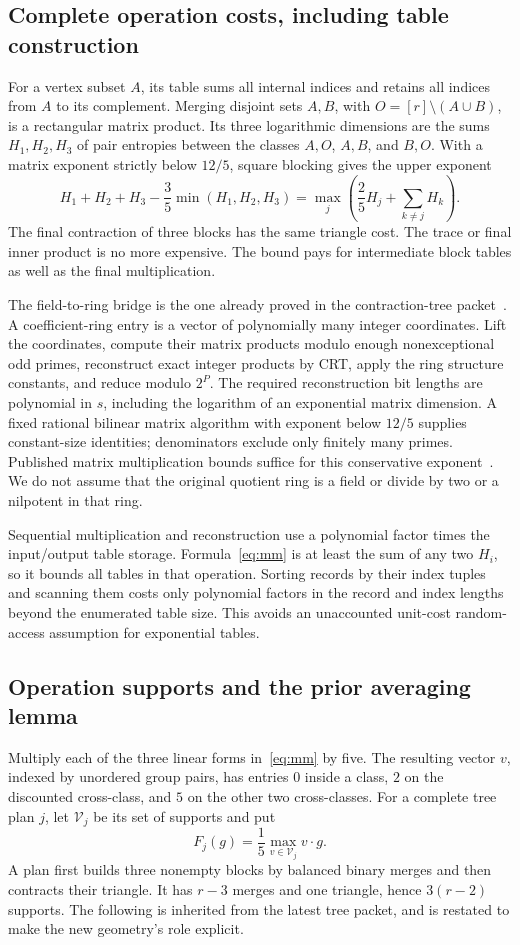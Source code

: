 \subsection{Complete operation costs, including table construction}
For a vertex subset $A$, its table sums all internal indices and retains all
indices from $A$ to its complement. Merging disjoint sets $A,B$, with
$O=[r]\setminus(A\cup B)$, is a rectangular matrix product. Its three
logarithmic dimensions are the sums $H_1,H_2,H_3$ of pair entropies between
the classes $A,O$, $A,B$, and $B,O$. With a matrix exponent strictly below
$12/5$, square blocking gives the upper exponent
\begin{equation}
 H_1+H_2+H_3-\frac35\min(H_1,H_2,H_3)
 =\max_j\left(\frac25H_j+\sum_{k\ne j}H_k\right).\label{eq:mm}
\end{equation}
The final contraction of three blocks has the same triangle cost. The trace
or final inner product is no more expensive. The bound pays for intermediate
block tables as well as the final multiplication.

The field-to-ring bridge is the one already proved in the contraction-tree
packet~\cite{tree,tree-old}. A coefficient-ring entry is a vector of
polynomially many integer coordinates. Lift the coordinates, compute their
matrix products modulo enough nonexceptional odd primes, reconstruct exact
integer products by CRT, apply the ring structure constants, and reduce
modulo $2^P$. The required reconstruction bit lengths are polynomial in
$s$, including the logarithm of an exponential matrix dimension. A fixed
rational bilinear matrix algorithm with exponent below $12/5$ supplies
constant-size identities; denominators exclude only finitely many primes.
Published matrix multiplication bounds suffice for this conservative
exponent~\cite{mm}. We do not assume that the original quotient ring is a
field or divide by two or a nilpotent in that ring.

Sequential multiplication and reconstruction use a polynomial factor times
the input/output table storage. Formula~\eqref{eq:mm} is at least the sum
of any two $H_i$, so it bounds all tables in that operation. Sorting records
by their index tuples and scanning them costs only polynomial factors in the
record and index lengths beyond the enumerated table size. This avoids an
unaccounted unit-cost random-access assumption for exponential tables.

\subsection{Operation supports and the prior averaging lemma}
Multiply each of the three linear forms in~\eqref{eq:mm} by five.
The resulting vector $v$, indexed by unordered group pairs, has entries
$0$ inside a class, $2$ on the discounted cross-class, and $5$ on the other
two cross-classes. For a complete tree plan $j$, let $\mathcal V_j$ be its
set of supports and put
\[
 F_j(g)=\frac15\max_{v\in\mathcal V_j}v\cdot g.
\]
A plan first builds three nonempty blocks by balanced binary merges and
then contracts their triangle. It has $r-3$ merges and one triangle,
hence $3(r-2)$ supports. The following is inherited from the latest tree
packet, and is restated to make the new geometry's role explicit.

